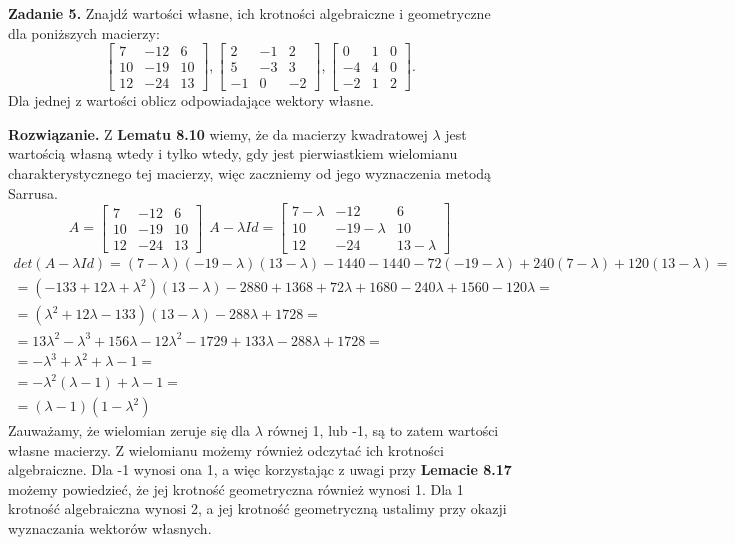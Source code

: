 \documentclass[12pt,a4paper]{article}
\begin{document}
\noindent
\textbf{Zadanie 5. }
Znajdź wartości własne, ich krotności algebraiczne i geometryczne dla poniższych macierzy:
\[
\left[
\begin{array}{ccc}
7 & -12 & 6\\
10 & -19 & 10\\
12 & -24 & 13
\end{array}\right]
,
\left[
\begin{array}{ccc}
2 & -1 & 2\\
5 & -3 & 3\\
-1 & 0 & -2
\end{array}\right]
,
\left[
\begin{array}{ccc}
0 & 1 & 0\\
-4 & 4 & 0\\
-2 & 1 & 2
\end{array}\right]
.
\]
Dla jednej z wartości oblicz odpowiadające wektory własne.

\vskip 0.4cm
\noindent
\textbf{Rozwiązanie.}
Z \textbf{Lematu 8.10} wiemy, że da macierzy kwadratowej \(\lambda\) jest wartością własną wtedy i tylko wtedy, gdy jest pierwiastkiem wielomianu charakterystycznego tej macierzy, więc zaczniemy od jego wyznaczenia metodą Sarrusa.
\[
A=
\left[
\begin{array}{ccc}
7 & -12 & 6\\
10 & -19 & 10\\
12 & -24 & 13
\end{array}\right]
~~A-\lambda Id=
\left[
\begin{array}{ccc}
7 - \lambda & -12 & 6\\
10 & -19 - \lambda & 10\\
12 & -24 & 13 - \lambda
\end{array}\right]
\]
\[
\begin{array}{c}
det(A-\lambda Id) = (7-\lambda) (-19-\lambda)(13 - \lambda) - 1440 - 1440 -72(-19 - \lambda)+240(7-\lambda)+120(13 - \lambda)= \\
= (-133 + 12\lambda + \lambda^2) (13 - \lambda) - 2880 + 1368 + 72\lambda + 1680 - 240\lambda + 1560 - 120\lambda=\\
= (\lambda^2 + 12\lambda -133) (13 - \lambda) - 288\lambda + 1728=\\
= 13\lambda^2 - \lambda^3 + 156\lambda - 12\lambda^2 - 1729 + 133\lambda - 288\lambda + 1728 = \\
= -\lambda^3 + \lambda^2 + \lambda -1 = \\
= -\lambda^2(\lambda-1) + \lambda - 1 = \\
= (\lambda - 1) (1-\lambda^2)
\end{array}
\]
Zauważamy, że wielomian zeruje się dla \(\lambda\) równej 1, lub -1, są to zatem wartości własne macierzy. Z wielomianu możemy również odczytać ich krotności algebraiczne. Dla -1 wynosi ona 1, a więc korzystając z uwagi przy \textbf{Lemacie 8.17} możemy powiedzieć, że jej krotność geometryczna również wynosi 1. Dla 1 krotność algebraiczna wynosi 2, a jej krotność geometryczną ustalimy przy okazji wyznaczania wektorów własnych.
\end{document}
